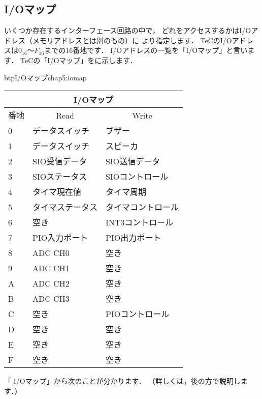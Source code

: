 \subsection{I/Oマップ}
\label{iomap}

いくつか存在するインターフェース回路の中で，
どれをアクセスするかはI/Oアドレス（メモリアドレスとは別のもの）に
より指定します．
TeCのI/Oアドレスは$0_{16}$〜$F_{16}$までの16番地です．
I/Oアドレスの一覧を「I/Oマップ」と言います．
TeCの「I/Oマップ」をに示します．

\begin{mytable}{btp}{I/Oマップ}{chap5:iomap}
  \small\begin{tabular}{| l | l | l |}
  \hline
  \multicolumn{3}{|c|}{I/Oマップ} \\
  \hline
  番地 & \multicolumn{1}{|c|}{Read} & \multicolumn{1}{|c|}{Write} \\
  \hline
  0 & データスイッチ   & ブザー \\
  1 & データスイッチ   & スピーカ \\
  2 & SIO受信データ    & SIO送信データ \\
  3 & SIOステータス    & SIOコントロール \\
  4 & タイマ現在値     & タイマ周期 \\
  5 & タイマステータス & タイマコントロール \\
  6 & 空き             & INT3コントロール \\
  7 & PIO入力ポート    & PIO出力ポート \\
  8 & ADC CH0          & 空き \\
  9 & ADC CH1          & 空き \\
  A & ADC CH2          & 空き \\
  B & ADC CH3          & 空き \\
  C & 空き             & PIOコントロール \\
  D & 空き             & 空き \\
  E & 空き             & 空き \\
  F & 空き             & 空き \\
  \hline
  \end{tabular}
\end{mytable}

「 I/Oマップ」から次のことが分かります．
（詳しくは，後の方で説明します．）

